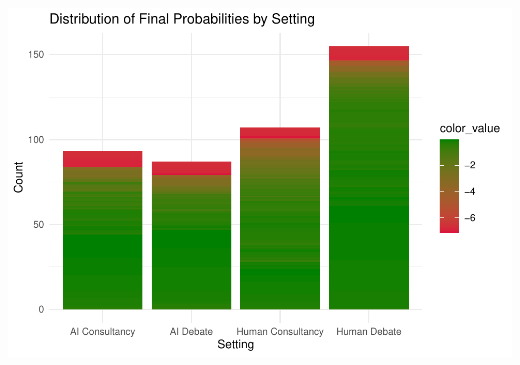 \documentclass[
]{article}
\begin{document}
\includegraphics{debate-2309_files/figure-latex/confident mistakes-2.pdf}
\end{document}
